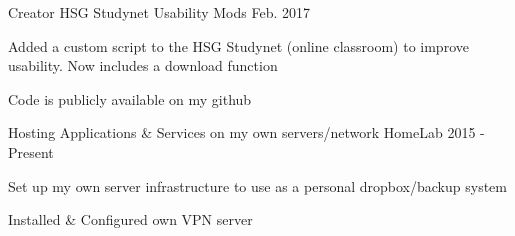

\begin{cventries}

  \cventry
    {Creator} %
    {HSG Studynet Usability Mods} %
    {} %
    {Feb. 2017} %
    {
      \begin{cvitems} %
        \item {Added a custom script to the HSG Studynet (online classroom) to improve usability. Now includes a download function}
        \item {Code is publicly available on my github}
      \end{cvitems}
    }

  \cventry
    {Hosting Applications \& Services on my own servers/network} %
    {HomeLab} %
    { } %
    {2015 - Present} %
    {
      \begin{cvitems} %
        \item {Set up my own server infrastructure to use as a personal dropbox/backup system}
        \item {Installed \& Configured own VPN server}
      \end{cvitems}
    }

\end{cventries}

